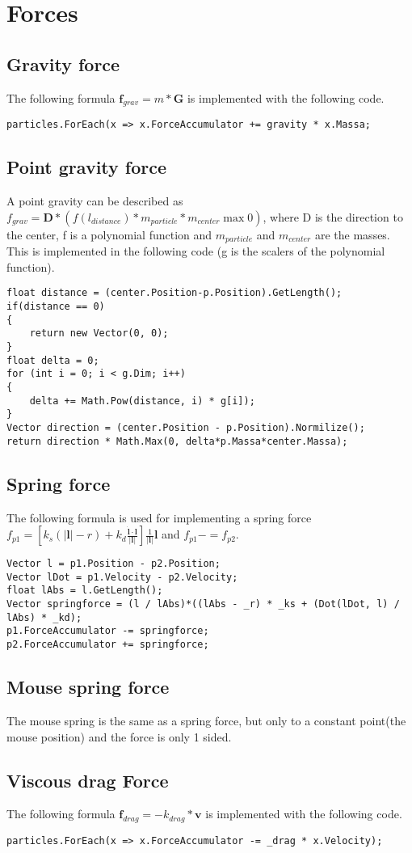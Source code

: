 \chapter{Forces}

\section{Gravity force}
The following formula $\boldsymbol{f}_{grav} = m*\boldsymbol{G}$ is implemented with the following code.
\begin{lstlisting}
particles.ForEach(x => x.ForceAccumulator += gravity * x.Massa;
\end{lstlisting}

\section{Point gravity force}
A point gravity can be described as $f_{grav} = \boldsymbol{D}*(f(l_{distance})*m_{particle}*m_{center} \max 0)$, where D is the direction to the center, f is a polynomial function and $m_{particle}$ and $m_{center}$ are the masses. This is implemented in the following code (g is the scalers of the polynomial function).
\begin{lstlisting}
float distance = (center.Position-p.Position).GetLength();
if(distance == 0)
{
	return new Vector(0, 0);
}
float delta = 0;
for (int i = 0; i < g.Dim; i++)
{
	delta += Math.Pow(distance, i) * g[i]);
}
Vector direction = (center.Position - p.Position).Normilize();
return direction * Math.Max(0, delta*p.Massa*center.Massa);
\end{lstlisting}

\section{Spring force}
The following formula is used for implementing a spring force $f_{p1} = [{k_s(|\boldsymbol{l}| - r) + k_d \frac{\boldsymbol{\dot{l}}\cdot\boldsymbol{l}}{|\boldsymbol{l}|}}]\frac{1}{|\boldsymbol{l}|}\boldsymbol{l}$ and $f_{p1} -= f_{p2}$.
\begin{lstlisting}
Vector l = p1.Position - p2.Position;
Vector lDot = p1.Velocity - p2.Velocity;
float lAbs = l.GetLength();
Vector springforce = (l / lAbs)*((lAbs - _r) * _ks + (Dot(lDot, l) / lAbs) * _kd);
p1.ForceAccumulator -= springforce;
p2.ForceAccumulator += springforce;
\end{lstlisting}

\section{Mouse spring force}
The mouse spring is the same as a spring force, but only to a constant point(the mouse position) and the force is only 1 sided.

\section{Viscous drag Force}
The following formula $\boldsymbol{f}_{drag} = -k_{drag}*\boldsymbol{v}$ is implemented with the following code.
\begin{lstlisting}
particles.ForEach(x => x.ForceAccumulator -= _drag * x.Velocity);
\end{lstlisting} 